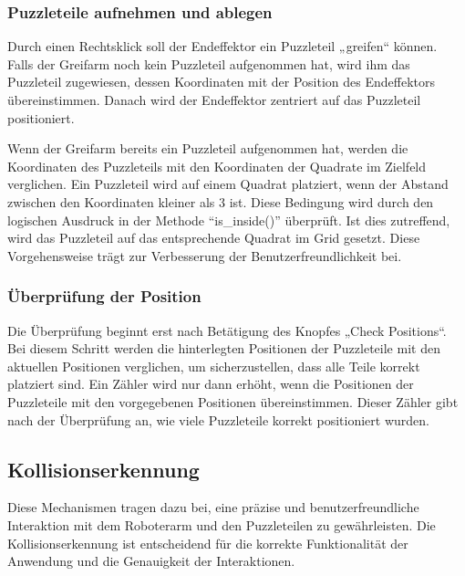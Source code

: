 \documentclass[12pt]{article}
\begin{document}
    \subsubsection{Puzzleteile aufnehmen und ablegen}
    Durch einen Rechtsklick soll der Endeffektor ein Puzzleteil „greifen“ können. Falls der Greifarm noch
    kein Puzzleteil aufgenommen hat, wird ihm das Puzzleteil zugewiesen, dessen Koordinaten mit der
    Position des Endeffektors übereinstimmen. Danach wird der Endeffektor zentriert auf das Puzzleteil
    positioniert.

    Wenn der Greifarm bereits ein Puzzleteil aufgenommen hat, werden die Koordinaten des Puzzleteils mit
    den Koordinaten der Quadrate im Zielfeld verglichen. Ein Puzzleteil wird auf einem Quadrat platziert,
    wenn der Abstand zwischen den Koordinaten kleiner als 3 ist. Diese Bedingung wird durch den logischen
    Ausdruck in der Methode “is\_inside()” überprüft. Ist dies zutreffend, wird das Puzzleteil auf das
    entsprechende Quadrat im Grid gesetzt. Diese Vorgehensweise trägt zur Verbesserung der
    Benutzerfreundlichkeit bei.

    
    

    \subsubsection{Überprüfung der Position}
    Die Überprüfung beginnt erst nach Betätigung des Knopfes „Check Positions“. Bei diesem Schritt
    werden die hinterlegten Positionen der Puzzleteile mit den aktuellen Positionen verglichen, um
    sicherzustellen, dass alle Teile korrekt platziert sind. Ein Zähler wird nur dann erhöht, wenn die
    Positionen der Puzzleteile mit den vorgegebenen Positionen übereinstimmen. Dieser Zähler gibt nach
    der Überprüfung an, wie viele Puzzleteile korrekt positioniert wurden.

    

    \subsection{Kollisionserkennung}
    Diese Mechanismen tragen dazu bei, eine präzise und benutzerfreundliche Interaktion mit dem
    Roboterarm und den Puzzleteilen zu gewährleisten. Die Kollisionserkennung ist entscheidend für
    die korrekte Funktionalität der Anwendung und die Genauigkeit der Interaktionen.
\end{document}
